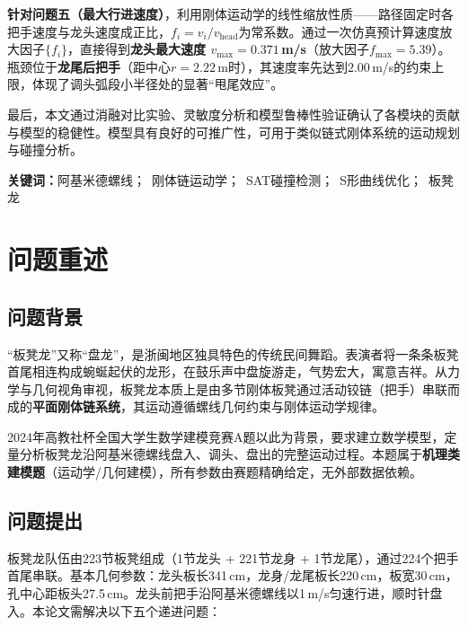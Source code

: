 \documentclass[12pt]{ctexart}
\begin{document}
\textbf{针对问题五（最大行进速度）}，利用刚体运动学的线性缩放性质——路径固定时各把手速度与龙头速度成正比，$f_i=v_i/v_{\text{head}}$为常系数。通过一次仿真预计算速度放大因子$\{f_i\}$，直接得到\textbf{龙头最大速度 $v_{\max}=0.371$\,m/s}（放大因子$f_{\max}=5.39$）。瓶颈位于\textbf{龙尾后把手}（距中心$r=2.22$\,m时），其速度率先达到$2.00$\,m/s的约束上限，体现了调头弧段小半径处的显著``甩尾效应''。

最后，本文通过消融对比实验、灵敏度分析和模型鲁棒性验证确认了各模块的贡献与模型的稳健性。模型具有良好的可推广性，可用于类似链式刚体系统的运动规划与碰撞分析。

\vspace{0.8em}
\noindent\textbf{关键词：}\quad 阿基米德螺线；\ 刚体链运动学；\ SAT碰撞检测；\ S形曲线优化；\ 板凳龙

\newpage

\setcounter{tocdepth}{2}
\renewcommand{\contentsname}{\centerline{\zihao{4}\textbf{目\quad 录}}}
\tableofcontents
\newpage

\section{问题重述}

\subsection{问题背景}

``板凳龙''又称``盘龙''，是浙闽地区独具特色的传统民间舞蹈。表演者将一条条板凳首尾相连构成蜿蜒起伏的龙形，在鼓乐声中盘旋游走，气势宏大，寓意吉祥。从力学与几何视角审视，板凳龙本质上是由多节刚体板凳通过活动铰链（把手）串联而成的\textbf{平面刚体链系统}，其运动遵循螺线几何约束与刚体运动学规律。

2024年高教社杯全国大学生数学建模竞赛A题以此为背景，要求建立数学模型，定量分析板凳龙沿阿基米德螺线盘入、调头、盘出的完整运动过程。本题属于\textbf{机理类建模题}（运动学/几何建模），所有参数由赛题精确给定，无外部数据依赖。

\subsection{问题提出}

板凳龙队伍由223节板凳组成（1节龙头 + 221节龙身 + 1节龙尾），通过224个把手首尾串联。基本几何参数：龙头板长341\,cm，龙身/龙尾板长220\,cm，板宽30\,cm，孔中心距板头27.5\,cm。龙头前把手沿阿基米德螺线以1\,m/s匀速行进，顺时针盘入。本论文需解决以下五个递进问题：
\end{document}
